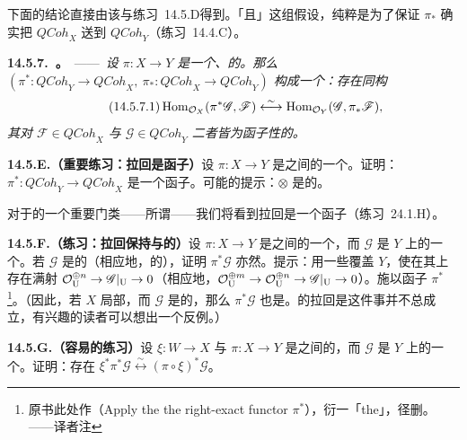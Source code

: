 下面的结论直接由该\trUniversalProperty{}与\mbox{练习~14.5.D}得到。「\trQuasicompact{}且\trQuasiSeparated」这组假设，纯粹是为了保证 $\pi_*$ 确实把 $\mathit{QCoh}_X$ 送到 $\mathit{QCoh}_Y$（\mbox{练习~14.4.C}）。

\textbf{14.5.7.\ \trhProposition{}。}\ ——\ \emph{设 $\pi\colon X\to Y$ 是一个\trQuasicompact{}、\trQuasiSeparated{}的\trMorphism。那么 $(\pi^*\colon\mathit{QCoh}_Y\to\mathit{QCoh}_X,\ \pi_*\colon\mathit{QCoh}_X\to\mathit{QCoh}_Y)$ 构成一个\trAdjointPair：存在同构}
\begin{equation*}\tag{14.5.7.1}\label{eq:pullback-pushforward-adjunction}
\operatorname{Hom}_{\mathcal{O}_X}(\pi^*\mathscr{G},\mathscr{F})\overset{\sim}{\longleftrightarrow}\operatorname{Hom}_{\mathcal{O}_Y}(\mathscr{G},\pi_*\mathscr{F}),
\end{equation*}
\emph{其对 $\mathscr{F}\in\mathit{QCoh}_X$ 与 $\mathscr{G}\in\mathit{QCoh}_Y$ 二者皆为函子性的。}

\textbf{14.5.E.（重要练习：拉回是\trRightExact{}函子）}\quad 设 $\pi\colon X\to Y$ 是\trScheme{}之间的一个\trMorphism。证明：$\pi^*\colon\mathit{QCoh}_Y\to\mathit{QCoh}_X$ 是一个\trRightExact{}函子。可能的提示：$\otimes$ 是\trRightExact{}的。

对于\trMorphism{}的一个重要门类——所谓\emph{\trFlat{}\trMorphism}——我们将看到拉回是一个\trExact{}函子（\mbox{练习~24.1.H}）。

\textbf{14.5.F.（练习：拉回保持\trFiniteType{}与\trFinitelyPresented{}的\trQCSheaf）}\quad 设 $\pi\colon X\to Y$ 是\trScheme{}之间的一个\trMorphism，而 $\mathscr{G}$ 是 $Y$ 上的一个\trQCSheaf。若 $\mathscr{G}$ 是\trFiniteType{}的（相应地，\trFinitelyPresented{}的），证明 $\pi^*\mathscr{G}$ 亦然。提示：用一些\trOpenSet{}覆盖 $Y$，使在其上存在满射 $\mathcal{O}_{\mathrm{U}}^{\oplus n}\to\mathscr{G}\vert_{\mathrm{U}}\to 0$（相应地，$\mathcal{O}_{\mathrm{U}}^{\oplus m}\to\mathcal{O}_{\mathrm{U}}^{\oplus n}\to\mathscr{G}\vert_{\mathrm{U}}\to 0$）。施以\trRightExact{}函子 $\pi^*$\footnote{原书此处作（Apply the the right-exact functor $\pi^*$），衍一「the」，径删。——译者注}。（因此，若 $X$ 局部\trNoetherian{}，而 $\mathscr{G}$ 是\trCoh{}的，那么 $\pi^*\mathscr{G}$ 也是。\trCoherentSheaf{}的拉回是\trCoherentSheaf{}这件事并不总成立，有兴趣的读者可以想出一个反例。）

\textbf{14.5.G.（容易的练习）}\quad 设 $\xi\colon W\to X$ 与 $\pi\colon X\to Y$ 是\trScheme{}之间的\trMorphism，而 $\mathscr{G}$ 是 $Y$ 上的一个\trQCSheaf。证明：存在\trCanonical{}\trIsomorphism{} $\xi^*\pi^*\mathscr{G}\overset{\sim}{\longleftrightarrow}(\pi\circ\xi)^*\mathscr{G}$。


